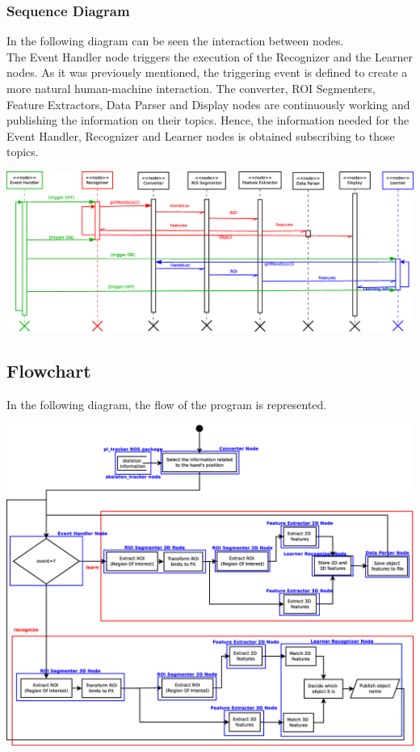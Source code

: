 \documentclass{article}
\begin{document}
\subsubsection{Sequence Diagram}
In the following diagram can be seen the interaction between nodes. \\
The Event Handler node triggers the execution of the Recognizer and the Learner nodes. As it was previously mentioned, the triggering event is defined to create a more natural human-machine interaction.
The converter, ROI Segmenters, Feature Extractors, Data Parser and Display nodes are continuously working and publishing the information on their topics. 
Hence, the information needed for the Event Handler, Recognizer and Learner nodes is obtained subscribing to those topics. 
\begin{center}
\includegraphics[scale=0.3]{img/diagrams/sequence.eps}
\end{center}

\subsection{Flowchart}
In the following diagram, the flow of the program is represented. 
\begin{center}
\includegraphics[scale=0.25]{img/diagrams/flowcharts.eps}
\end{center}
\end{document}
